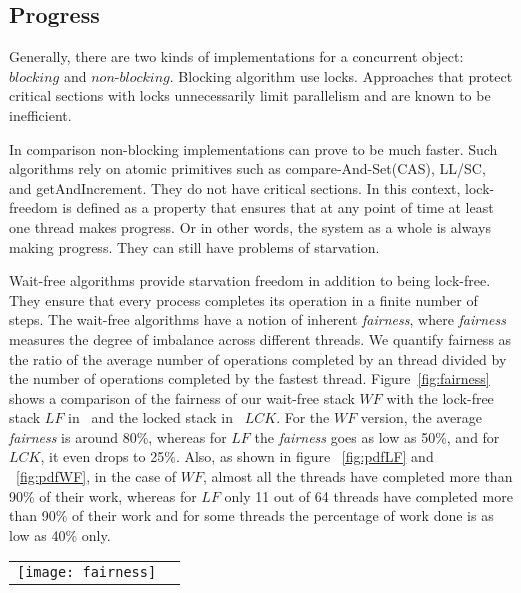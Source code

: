 \documentclass{llncs}
\begin{document}
\begin{appendix}
\subsection{Progress}
\label{subsec:progress}

Generally, there are two kinds of implementations for a concurrent object:
$blocking$ and $non$-$blocking$. Blocking algorithm use locks. Approaches
that protect critical sections with locks unnecessarily limit parallelism
and are known to be inefficient.


In comparison non-blocking implementations can prove to be much faster.
Such algorithms rely on atomic primitives such as 
compare-And-Set(CAS), LL/SC, and getAndIncrement. They do not have
critical sections.
In this context,  lock-freedom is defined as a property that ensures
that at any point of time at least one thread makes progress.
Or in other words, the system as a whole is always making progress. They
can still have problems of starvation.

Wait-free algorithms provide starvation freedom in addition
to being lock-free. They ensure that every process completes
its operation in a finite number of steps. The wait-free algorithms
have a notion of inherent {\em fairness}, where {\em fairness} measures the degree of 
imbalance across different threads. We quantify fairness as the ratio of the average number
of operations completed by an thread divided by the number of operations completed by the fastest
thread. Figure~\ref{fig:fairness} shows a comparison of the fairness
of our wait-free stack $WF$ with the lock-free stack $LF$ in~\cite{LockFree} 
and the locked stack in~\cite{michaelScottLocked} $LCK$. 
For the $WF$ version, the average {\em fairness} is around 80\%, whereas for $LF$ the {\em fairness} 
goes as low as 50\%, and for $LCK$, it even drops to 25\%.
Also, as shown in figure ~\ref{fig:pdfLF} and ~\ref{fig:pdfWF},
in the case of $WF$, almost all the threads have completed more than 90\% of their work,
whereas for $LF$ only 11 out of 64 threads have completed more than 90\% of their work
and for some threads the percentage of work done is as low as 40\% only.


\begin{figure*}[!htb]
\begin{center}
\begin{tabular}{cc}

\begin{minipage}{.33\textwidth}
\texttt{[image: fairness]}
\caption {Fairness \label{fig:fairness} }
\end{minipage}


\end{tabular}
\end{center}
\end{figure*}
\end{appendix}
\end{document}
